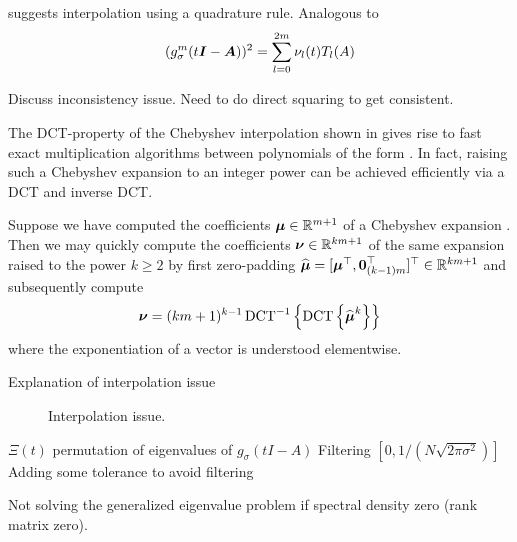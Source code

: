 \cite{lin2017randomized} suggests interpolation using a quadrature rule.
Analogous to 
\begin{equation}
    (g_{\sigma}^m(t\boldsymbol{I} - \boldsymbol{A}))^2 = \sum_{l=0}^{2m} \nu_l(t) T_l(A)
    \label{equ:3-nystrom-ESS-chebyshev-expansion}
\end{equation}

Discuss inconsistency issue. Need to do direct squaring to get consistent.

The \gls{DCT}-property of the Chebyshev interpolation shown in 
gives rise to fast exact multiplication algorithms between polynomials
of the form  \cite[Proposition~3.1]{baszenski1997cosine}.
In fact, raising such a Chebyshev expansion to an integer power can be achieved
efficiently via a \gls{DCT} and inverse \gls{DCT}.

Suppose we have computed the coefficients $\boldsymbol{\mu} \in \mathbb{R}^{m+1}$
of a Chebyshev expansion .
Then we may quickly compute the coefficients $\boldsymbol{\nu} \in \mathbb{R}^{km+1}$
of the same expansion raised to the power $k \geq 2$ by first zero-padding
$\widehat{\boldsymbol{\mu}} = [\boldsymbol{\mu}^{\top}, \boldsymbol{0}_{(k-1)m}^{\top}]^{\top} \in \mathbb{R}^{km+1}$
and subsequently compute
\begin{equation}
    \boldsymbol{\nu} = (km + 1)^{k - 1} \operatorname{DCT}^{-1}\left\{ \operatorname{DCT}\left\{\widehat{\boldsymbol{\mu}}^{k}\right\} \right\}
    \label{equ:3-nystrom-chebyshev-square-coefficients}
\end{equation}
where the exponentiation of a vector is understood elementwise.

Explanation of interpolation issue \cite{lin2017randomized}
\begin{figure}[ht]
    \centering
    
    \caption{Interpolation issue.}
    \label{fig:3-nystrom-interpolation-issue}
\end{figure}

$\Xi(t)$ permutation of eigenvalues of $g_{\sigma}(tI - A)$
Filtering $[0, 1 / (N \sqrt{2 \pi \sigma^2})]$ \cite{lin2017randomized}
Adding some tolerance to avoid filtering

Not solving the generalized eigenvalue problem if spectral density zero (rank matrix zero).

